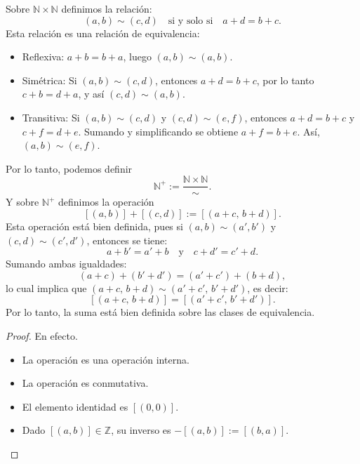 \noindent Sobre \( \mathbb{N} \times \mathbb{N} \) definimos la relación:
\[
(a,b) \sim (c,d) \quad \text{si y solo si} \quad a + d = b + c.
\]Esta relación es una relación de equivalencia:
\begin{itemize}
	\item Reflexiva: \( a + b = b + a \), luego \( (a,b) \sim (a,b) \).
	\item Simétrica: Si \( (a,b) \sim (c,d) \), entonces \( a + d = b + c \), por lo tanto \( c + b = d + a \), y así \( (c,d) \sim (a,b) \).
	\item Transitiva: Si \( (a,b) \sim (c,d) \) y \( (c,d) \sim (e,f) \), entonces \( a + d = b + c \) y \( c + f = d + e \). Sumando y simplificando se obtiene \( a + f = b + e \). Así, \( (a,b) \sim (e,f) \).
\end{itemize}
\noindent Por lo tanto, podemos definir
\[
\mathbb{N}^{+} := \dfrac{\mathbb{N} \times \mathbb{N}}{\sim}.
\]
Y sobre \( \mathbb{N^+} \) definimos la operación
\[
[(a,b)] + [(c,d)] := [(a+c,\, b+d)].
\]
Esta operación está bien definida, pues si \( (a,b) \sim (a',b') \) y \( (c,d) \sim (c',d') \), entonces se tiene:
\[
a + b' = a' + b \quad \text{y} \quad c + d' = c' + d.
\]
Sumando ambas igualdades:
\[
(a + c) + (b' + d') = (a' + c') + (b + d),
\]
lo cual implica que \( (a + c,\, b + d) \sim (a' + c',\, b' + d') \), es decir:
\[
[(a+c,\, b+d)] = [(a'+c',\, b'+d')].
\]
Por lo tanto, la suma está bien definida sobre las clases de equivalencia.

\begin{proposicion}
\end{proposicion}

\begin{proof}
	En efecto.
	\begin{itemize}
		\item La operación es una operación interna.
		\item La operación es conmutativa.
		\item El elemento identidad es \( [(0,0)] \).
		\item Dado \( [(a,b)] \in \mathbb{Z} \), su inverso es \( -[(a,b)] := [(b,a)] \).
	\end{itemize}
\end{proof}



\begin{proposicion}
\end{proposicion}

